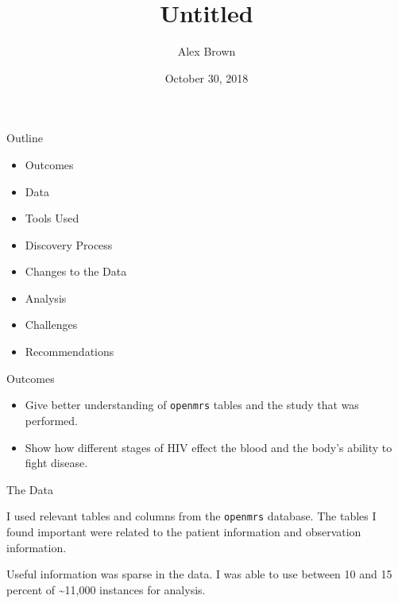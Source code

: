 \documentclass[ignorenonframetext,]{beamer}
\title{Untitled}
\author{Alex Brown}
\date{October 30, 2018}
\providecommand{\tightlist}{%
\setlength{\itemsep}{0pt}\setlength{\parskip}{0pt}}
\begin{document}
\frame{\titlepage}

\begin{frame}{Outline}

\begin{itemize}
\tightlist
\item
  Outcomes
\item
  Data
\item
  Tools Used
\item
  Discovery Process
\item
  Changes to the Data
\item
  Analysis
\item
  Challenges
\item
  Recommendations
\end{itemize}

\end{frame}

\begin{frame}[fragile]{Outcomes}

\begin{itemize}
\tightlist
\item
  Give better understanding of \texttt{openmrs} tables and the study
  that was performed.
\item
  Show how different stages of HIV effect the blood and the body's
  ability to fight disease.
\end{itemize}

\end{frame}

\begin{frame}[fragile]{The Data}

I used relevant tables and columns from the \texttt{openmrs} database.
The tables I found important were related to the patient information and
observation information.

Useful information was sparse in the data. I was able to use between 10
and 15 percent of \textasciitilde{}11,000 instances for analysis.

\end{frame}
\end{document}
